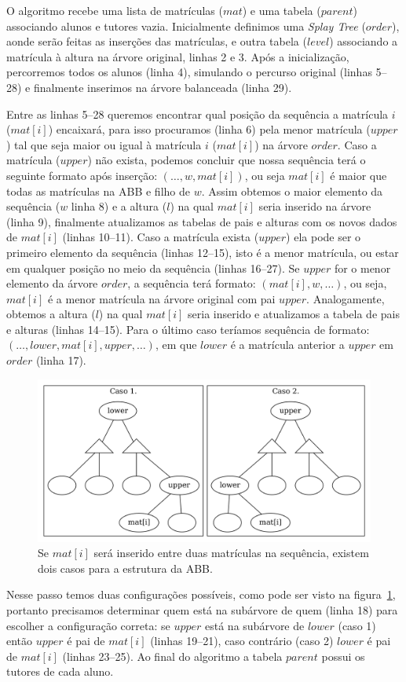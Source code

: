 O algoritmo recebe uma lista de matrículas ($mat$) e uma tabela ($parent$) associando alunos e
tutores vazia. Inicialmente definimos uma \textit{Splay Tree} ($order$), aonde
serão feitas as inserções das matrículas, e outra tabela ($level$) associando a matrícula à
altura na árvore original, linhas 2 e 3. Após a inicialização, percorremos todos
os alunos (linha 4), simulando o percurso original (linhas 5--28) e finalmente
inserimos na árvore balanceada (linha 29).

Entre as linhas 5--28 queremos
encontrar qual posição da sequência a matrícula $i$ ($mat[i]$) encaixará,
para isso procuramos (linha 6) pela menor matrícula ($upper$) tal que seja maior
ou igual à matrícula $i$ ($mat[i]$) na árvore $order$. Caso a matrícula ($upper$) não
exista, podemos concluir que nossa sequência terá o seguinte formato após inserção: $(\ldots,
w,mat[i])$, ou seja $mat[i]$ é maior que todas as matrículas na ABB e filho de $w$. Assim obtemos o maior elemento da sequência ($w$ linha
8) e a altura ($l$) na qual $mat[i]$ seria inserido na árvore (linha 9),
finalmente atualizamos as tabelas de pais e alturas com os novos dados de $mat[i]$
(linhas 10--11). Caso a matrícula exista ($upper$) ela pode ser o primeiro
elemento da sequência (linhas 12--15), isto é a menor matrícula, ou estar em qualquer posição no
meio da sequência (linhas 16--27). Se $upper$ for o menor elemento da árvore
$order$, a sequência terá formato: $(mat[i], w, \ldots)$, ou seja, $mat[i]$ é a
menor matrícula na árvore original com pai $upper$. Analogamente, obtemos a altura ($l$) na qual
$mat[i]$ seria inserido e atualizamos a tabela de pais e alturas (linhas 14--15).
Para o último caso teríamos sequência de formato: $(\ldots, lower, mat[i],
upper, \ldots)$, em que $lower$ é a matrícula anterior a $upper$ em $order$
(linha 17).
\begin{figure}[!htb]
  \centering
  \includegraphics[width=0.7\linewidth]{lxu.png}
  \caption{Se $mat[i]$ será inserido entre duas matrículas na sequência, existem dois casos para a estrutura da ABB.}
  \label{fig:lxu}
\end{figure}
Nesse passo temos duas configurações possíveis, como pode ser visto
na figura~\ref{fig:lxu}, portanto precisamos determinar quem está na subárvore
de quem (linha 18) para escolher a configuração correta: se $upper$ está na subárvore de $lower$ (caso 1) então $upper$ é pai de $mat[i]$ (linhas 19--21), caso contrário (caso 2) $lower$ é pai de $mat[i]$ (linhas 23--25). Ao final do algoritmo a
tabela $parent$ possui os tutores de cada aluno.

